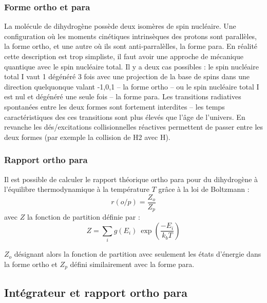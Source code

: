 \documentclass[10pt, a4paper]{report}
\numberwithin{equation}{subsection}
\begin{document}
\subsubsection{Forme ortho et para}
La molécule de dihydrogène possède deux isomères de spin nucléaire. Une configuration où les moments cinétiques intrinsèques des protons sont parallèles, la forme ortho, et une autre où ils sont anti-parralèlles, la forme para. En réalité cette description est trop simpliste, il faut avoir une approche de mécanique quantique avec le spin nucléaire total. Il y a deux cas possibles : le spin nucléaire total I vaut 1 dégénéré 3 fois avec une projection de la base de spins dans une direction quelquonque valant {-1,0,1} -- la forme ortho -- ou le spin nucléaire total I est nul et dégénéré une seule fois -- la forme para. Les transitions radiatives spontanées entre les deux formes sont fortement interdites -- les temps caractéristiques des ces transitions sont plus élevés que l'âge de l'univers. En revanche les dés/excitations collisionnelles réactives permettent de passer entre les deux formes (par exemple la collision de H2 avec H). 
\subsubsection{Rapport ortho para}
Il est possible de calculer le rapport théorique ortho para pour du dihydrogène à l'équilibre thermodynamique à la température $T$ grâce à la loi de Boltzmann :
\begin{equation} \label{eq:EROP}
\boxed{r(o/p) = \frac{Z_o}{Z_p}}
\end{equation}
avec $Z$ la fonction de partition définie par :
\begin{equation} \label{eq:EZ}
 \boxed{Z = \sum\limits_i g(E_i) \ \exp\left(\frac{-E_i}{k_bT}\right)}
\end{equation}
 
$Z_o$ désignant alors la fonction de partition avec seulement les états d'énergie dans la forme ortho et $Z_p$ défini similairement avec la forme para.


\subsection{Intégrateur et rapport ortho para}
\end{document}
